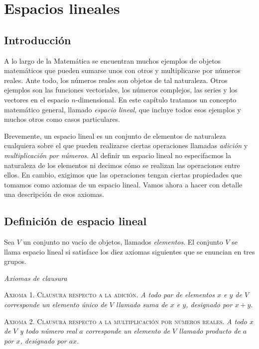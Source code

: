 \chapter{Espacios lineales}

\section{Introducción}

A lo largo de la Matemática se encuentran muchos ejemplos de objetos matemáticos que pueden sumarse unos con otros y multiplicarse por números reales. Ante todo, los números reales son objetos de tal naturaleza. Otros ejemplos son las funciones vectoriales, los números complejos, las series y los vectores en el espacio $n$-dimensional. En este capítulo tratamos un concepto matemático general, llamado {\it espacio lineal}, que incluye todos esos ejemplos y muchos otros como casos particulares.

Brevemente, un espacio lineal es un conjunto de elementos de naturaleza cualquiera sobre el que pueden realizarse ciertas operaciones llamadas {\it adición} y {\it multiplicación por números}. Al definir un espacio lineal no especifacmos la naturaleza de los elementos ni decimos cómo se realizan las operaciones entre ellos. En cambio, exigimos que las operaciones tengan ciertas propiedades que tomamos como axiomas de un espacio lineal. Vamos ahora a hacer con detalle una descripción de esos axiomas.

\section{Definición de espacio lineal}

Sea $V$ un conjunto no vacío de objetos, llamados {\it elementos}. El conjunto $V$ se llama espacio lineal si satisface los diez axiomas siguientes que se enuncian en tres grupos.

\vspace{.3cm}
\textit{Axiomas de clausura}

\vspace{.3cm}
\indent\textsc{Axioma 1. Clausura respecto a la adición.} {\it A todo par de elementos $x$ e $y$ de $V$ corresponde un elemento único de $V$ llamado suma de $x$ e $y$, designado por $x+y$}.

\vspace{.3cm}
\indent\textsc{Axioma 2. Clausura respecto a la multiplicación por números reales.} {\it A todo $x$de $V$ y todo número real $a$ corresponde un elemento de $V$ llamado producto de $a$ por $x$, designado por $ax$}.

